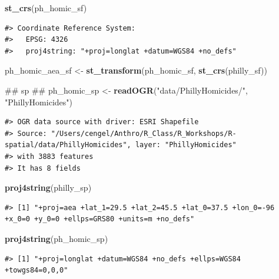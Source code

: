 \documentclass[]{book}
\newenvironment{Shaded}{\begin{snugshade}}{\end{snugshade}}
\newcommand{\KeywordTok}[1]{\textcolor[rgb]{0.13,0.29,0.53}{\textbf{#1}}}
\newcommand{\StringTok}[1]{\textcolor[rgb]{0.31,0.60,0.02}{#1}}
\newcommand{\NormalTok}[1]{#1}
\theoremstyle{definition}
\theoremstyle{definition}
\theoremstyle{definition}
\theoremstyle{remark}
\begin{document}
\begin{Shaded}
\begin{Highlighting}[]
\KeywordTok{st_crs}\NormalTok{(ph_homic_sf)}
\end{Highlighting}
\end{Shaded}

\begin{verbatim}
#> Coordinate Reference System:
#>   EPSG: 4326 
#>   proj4string: "+proj=longlat +datum=WGS84 +no_defs"
\end{verbatim}

\begin{Shaded}
\begin{Highlighting}[]
\NormalTok{ph_homic_aea_sf <-}\StringTok{ }\KeywordTok{st_transform}\NormalTok{(ph_homic_sf, }\KeywordTok{st_crs}\NormalTok{(philly_sf))}

\NormalTok{## sp ##}
\NormalTok{ph_homic_sp <-}\StringTok{ }\KeywordTok{readOGR}\NormalTok{(}\StringTok{"data/PhillyHomicides/"}\NormalTok{, }\StringTok{"PhillyHomicides"}\NormalTok{)}
\end{Highlighting}
\end{Shaded}

\begin{verbatim}
#> OGR data source with driver: ESRI Shapefile 
#> Source: "/Users/cengel/Anthro/R_Class/R_Workshops/R-spatial/data/PhillyHomicides", layer: "PhillyHomicides"
#> with 3883 features
#> It has 8 fields
\end{verbatim}

\begin{Shaded}
\begin{Highlighting}[]
\KeywordTok{proj4string}\NormalTok{(philly_sp)}
\end{Highlighting}
\end{Shaded}

\begin{verbatim}
#> [1] "+proj=aea +lat_1=29.5 +lat_2=45.5 +lat_0=37.5 +lon_0=-96 +x_0=0 +y_0=0 +ellps=GRS80 +units=m +no_defs"
\end{verbatim}

\begin{Shaded}
\begin{Highlighting}[]
\KeywordTok{proj4string}\NormalTok{(ph_homic_sp)}
\end{Highlighting}
\end{Shaded}

\begin{verbatim}
#> [1] "+proj=longlat +datum=WGS84 +no_defs +ellps=WGS84 +towgs84=0,0,0"
\end{verbatim}
\end{document}
